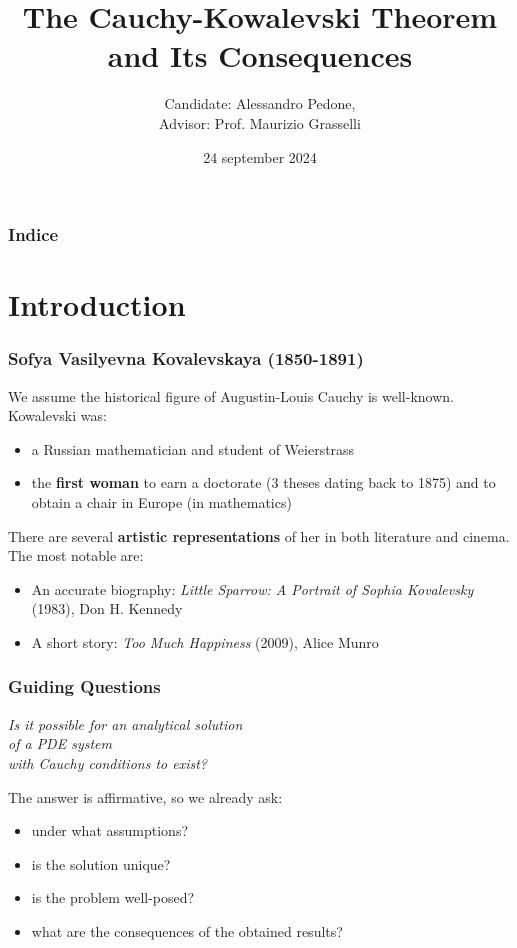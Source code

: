 \documentclass[serif,notheorems]{beamer}
\title{ The Cauchy-Kowalevski Theorem \\ and Its Consequences }
\author{Candidate: Alessandro Pedone,\\ Advisor: Prof. Maurizio Grasselli }
\institute{Politecnico di Milano}
\date{24 september 2024}
\theoremstyle{definition} %
\theoremstyle{remark}
\begin{document}
\frame{\titlepage}
\begin{frame}
    \frametitle{Indice}
    \tableofcontents
\end{frame}


\section{Introduction}

\begin{frame}
\frametitle{Sofya Vasilyevna Kovalevskaya (1850-1891)}
We assume the historical figure of Augustin-Louis Cauchy is well-known. \\
Kowalevski was:
\begin{itemize}
\item a Russian mathematician and student of Weierstrass
\item the \textbf{first woman} to earn a doctorate (3 theses dating back to 1875) and to obtain a chair in Europe (in mathematics)
\end{itemize}
\end{frame}

\begin{frame}
There are several \textbf{artistic representations} of her in both literature and cinema. The most notable are:
\begin{itemize}
\item An accurate biography: \textit{Little Sparrow: A Portrait of Sophia Kovalevsky} (1983), Don H. Kennedy
\item A short story: \textit{Too Much Happiness} (2009), Alice Munro
\end{itemize}
\end{frame}


\begin{frame}
\frametitle{Guiding Questions}
\begin{center}
\textit{ Is it possible for an analytical solution \\ of a PDE system \\ with Cauchy conditions to exist?}
\end{center}
\end{frame}

\begin{frame}
The answer is affirmative, so we already ask:
\begin{itemize}
\item under what assumptions?
\item is the solution unique?
\item is the problem well-posed?
\item what are the consequences of the obtained results?
\end{itemize}
\end{frame}
\end{document}

